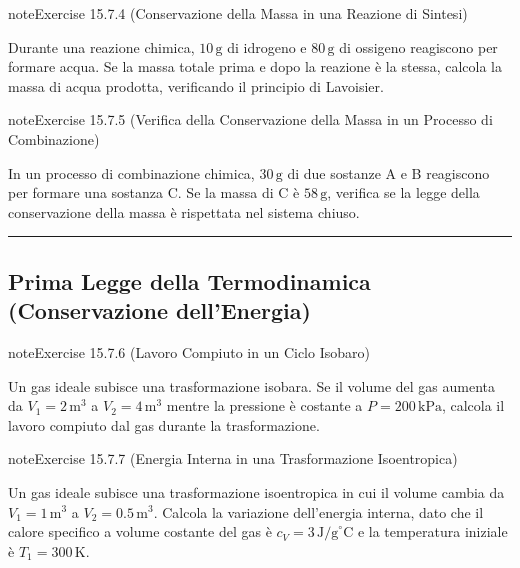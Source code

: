 \documentclass[letterpaper,10pt,italian]{jupyterBook}
\begin{document}
\begin{sphinxadmonition}{note}{Exercise 15.7.4 (Conservazione della Massa in una Reazione di Sintesi)}



\sphinxAtStartPar
Durante una reazione chimica, \(10 \, \text{g}\) di idrogeno e \(80 \, \text{g}\) di ossigeno reagiscono per formare acqua. Se la massa totale prima e dopo la reazione è la stessa, calcola la massa di acqua prodotta, verificando il principio di Lavoisier.
\end{sphinxadmonition}
 \label{exercise:ch/thermodynamics/principles-problems-exercise-4}

\begin{sphinxadmonition}{note}{Exercise 15.7.5 (Verifica della Conservazione della Massa in un Processo di Combinazione)}



\sphinxAtStartPar
In un processo di combinazione chimica, \(30 \, \text{g}\) di due sostanze A e B reagiscono per formare una sostanza C. Se la massa di C è \(58 \, \text{g}\), verifica se la legge della conservazione della massa è rispettata nel sistema chiuso.
\end{sphinxadmonition}


\bigskip\hrule\bigskip



\subsection{Prima Legge della Termodinamica (Conservazione dell’Energia)}
\label{\detokenize{ch/thermodynamics/principles-problems:prima-legge-della-termodinamica-conservazione-dell-energia}} \label{exercise:ch/thermodynamics/principles-problems-exercise-5}

\begin{sphinxadmonition}{note}{Exercise 15.7.6 (Lavoro Compiuto in un Ciclo Isobaro)}



\sphinxAtStartPar
Un gas ideale subisce una trasformazione isobara. Se il volume del gas aumenta da \(V_1 = 2 \, \text{m}^3\) a \(V_2 = 4 \, \text{m}^3\) mentre la pressione è costante a \(P = 200 \, \text{kPa}\), calcola il lavoro compiuto dal gas durante la trasformazione.
\end{sphinxadmonition}
 \label{exercise:ch/thermodynamics/principles-problems-exercise-6}

\begin{sphinxadmonition}{note}{Exercise 15.7.7 (Energia Interna in una Trasformazione Isoentropica)}



\sphinxAtStartPar
Un gas ideale subisce una trasformazione isoentropica in cui il volume cambia da \(V_1 = 1 \, \text{m}^3\) a \(V_2 = 0.5 \, \text{m}^3\). Calcola la variazione dell’energia interna, dato che il calore specifico a volume costante del gas è \(c_V = 3 \, \text{J/g}^\circ \text{C}\) e la temperatura iniziale è \(T_1 = 300 \, \text{K}\).
\end{sphinxadmonition}
 \label{exercise:ch/thermodynamics/principles-problems-exercise-7}
\end{document}
